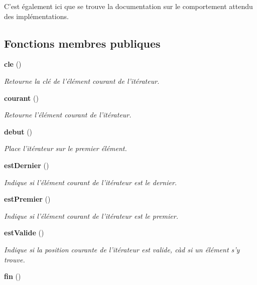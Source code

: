 C'est également ici que se trouve la documentation sur le comportement attendu des implémentations. \subsection*{Fonctions membres publiques}
\begin{CompactItemize}
\item 
{\bf cle} ()
\begin{CompactList}\small\item\em Retourne la clé de l'élément courant de l'itérateur. \item\end{CompactList}\item 
{\bf courant} ()
\begin{CompactList}\small\item\em Retourne l'élément courant de l'itérateur. \item\end{CompactList}\item 
{\bf debut} ()\label{class_iterateur_1600a0b47466d85a5bb4af10a634b1ed}

\begin{CompactList}\small\item\em Place l'itérateur sur le premier élément. \item\end{CompactList}\item 
{\bf estDernier} ()
\begin{CompactList}\small\item\em Indique si l'élément courant de l'itérateur est le dernier. \item\end{CompactList}\item 
{\bf estPremier} ()
\begin{CompactList}\small\item\em Indique si l'élément courant de l'itérateur est le premier. \item\end{CompactList}\item 
{\bf estValide} ()
\begin{CompactList}\small\item\em Indique si la position courante de l'itérateur est valide, càd si un élément s'y trouve. \item\end{CompactList}\item 
{\bf fin} ()\label{class_iterateur_487fadeda3651d2add97628652fa6d1e}


\end{CompactItemize}
